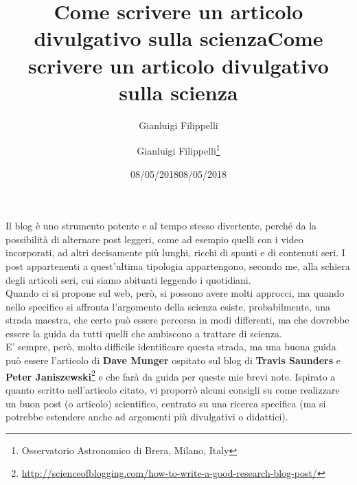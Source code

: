 \documentclass[12pt,a4paper]{article}
\title{Come scrivere un articolo divulgativo sulla scienza}
\author{Gianluigi Filippelli}
\date{08/05/2018}
\title{Come scrivere un articolo divulgativo sulla scienza}
\author{Gianluigi Filippelli\footnote{Osservatorio Astronomico di Brera, Milano, Italy}}
\date{08/05/2018}
\begin{document}
 \maketitle
 
 Il blog è uno strumento potente e al tempo stesso divertente, perché da la possibilità di alternare post leggeri, come ad esempio quelli con i video incorporati, ad altri decisamente più lunghi, ricchi di spunti e di contenuti seri. I post appartenenti a quest'ultima tipologia appartengono, secondo me, alla schiera degli articoli seri, cui siamo abituati leggendo i quotidiani.\\
 Quando ci si propone sul web, però, si possono avere molti approcci, ma quando nello specifico si affronta l'argomento della scienza esiste, probabilmente, una strada maestra, che certo può essere percorsa in modi differenti, ma che dovrebbe essere la guida da tutti quelli che ambiscono a trattare di scienza.\\
 E' sempre, però, molto difficile identificare questa strada, ma una buona guida può essere l'articolo di \textbf{Dave Munger} ospitato sul blog di \textbf{Travis Saunders} e \textbf{Peter Janiszewski}\footnote{\href{http://scienceofblogging.com/how-to-write-a-good-research-blog-post/}{http://scienceofblogging.com/how-to-write-a-good-research-blog-post/}} e che farà da guida per queste mie brevi note. Ispirato a quanto scritto nell'articolo citato, vi proporrò alcuni consigli su come realizzare un buon post (o articolo) scientifico, centrato su una ricerca specifica (ma si potrebbe estendere anche ad argomenti più divulgativi o didattici).
\end{document}
